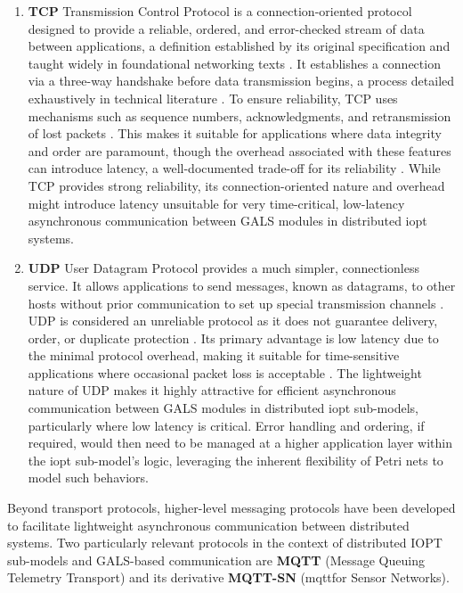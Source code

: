 \begin{enumerate}
    \item \textbf{TCP} Transmission Control Protocol is a connection-oriented protocol designed to provide a reliable, ordered, and error-checked stream of data between applications, a definition established by its original specification \cite{rfc793} and taught widely in foundational networking texts \cite{kurose2021}. It establishes a connection via a three-way handshake before data transmission begins, a process detailed exhaustively in technical literature \cite{stevens1994}. To ensure reliability, TCP uses mechanisms such as sequence numbers, acknowledgments, and retransmission of lost packets \cite{rfc793}. This makes it suitable for applications where data integrity and order are paramount, though the overhead associated with these features can introduce latency, a well-documented trade-off for its reliability \cite{kurose2021, stevens1994}. While TCP provides strong reliability, its connection-oriented nature and overhead might introduce latency unsuitable for very time-critical, low-latency asynchronous communication between GALS modules in distributed \gls{iopt} systems.
    \item \textbf{UDP} User Datagram Protocol provides a much simpler, connectionless service. It allows applications to send messages, known as datagrams, to other hosts without prior communication to set up special transmission channels \cite{rfc768}. UDP is considered an unreliable protocol as it does not guarantee delivery, order, or duplicate protection \cite{kurose2021}. Its primary advantage is low latency due to the minimal protocol overhead, making it suitable for time-sensitive applications where occasional packet loss is acceptable \cite{forouzan2010}. The lightweight nature of UDP makes it highly attractive for efficient asynchronous communication between GALS modules in distributed \gls{iopt} sub-models, particularly where low latency is critical. Error handling and ordering, if required, would then need to be managed at a higher application layer within the \gls{iopt} sub-model's logic, leveraging the inherent flexibility of Petri nets to model such behaviors. 

\end{enumerate}


Beyond transport protocols, higher-level messaging protocols have been developed to facilitate lightweight asynchronous communication between distributed systems. Two particularly relevant protocols in the context of distributed IOPT sub-models and GALS-based communication are \textbf{MQTT} (Message Queuing Telemetry Transport) and its derivative \textbf{MQTT-SN} (\gls{mqtt}for Sensor Networks).
 
